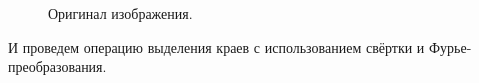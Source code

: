 \documentclass[a5paper, 10pt]{article}
\theoremstyle{definition}
\theoremstyle{plain}
\theoremstyle{remark}
\begin{document}
\begin{figure}[h!]
\caption{Оригинал изображения.}
\end{figure}

И проведем операцию выделения краев с использованием свёртки и Фурье-преобразования.
\end{document}
